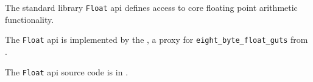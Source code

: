
The standard library {\tt Float} api defines access to core floating point arithmetic functionality.

The {\tt Float} api is implemented by the ,
a proxy for {\tt eight\_byte\_float\_guts} from .

The {\tt Float} api source code is in .





